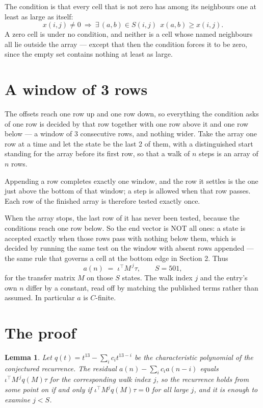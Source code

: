 \documentclass[11pt,a4paper]{article}
\theoremstyle{plain}
\newtheorem{lemma}[theorem]{Lemma}
\theoremstyle{definition}
\begin{document}
The condition is that every cell that is not zero has among its neighbours one at least as large as itself:
\[
x(i,j)\neq0\ \Longrightarrow\ \exists\,(a,b)\in S(i,j)\ \ x(a,b)\ge x(i,j).
\]
A zero cell is under no condition, and neither is a cell whose named neighbours all lie outside the array --- except that then the condition forces it to be zero, since the empty set contains nothing at least as large.

\section{A window of 3 rows}

The offsets reach one row up and one row down, so everything the condition asks of one row is
decided by that row together with one row above it and one row below --- a window of
$3$ consecutive rows, and nothing wider. Take the array one row at a time and
let the state be the last 2 of them, with a distinguished start standing for the array before its
first row, so that a walk of $n$ steps is an array of $n$ rows.

Appending a row completes exactly one window, and the row it settles is the one just above the bottom of that window; a step is
allowed when that row passes. Each row of the finished array is therefore tested exactly once.

When the array stops, the last row of it has never been tested, because the
conditions reach one row below. So the end vector is NOT all ones: a state is accepted exactly when
those rows pass with nothing below them, which is decided by running the same test on the window
with absent rows appended --- the same rule that governs a cell at the bottom edge in
Section 2.
Thus
\[
a(n)\;=\;\iota^{\!\top}M^{\,j}\tau ,\qquad S=501,
\]
for the transfer matrix $M$ on those $S$ states. The walk index $j$ and the entry's own $n$
differ by a constant, read off by matching the published terms rather than assumed. In
particular $a$ is $C$-finite.

\section{The proof}

\begin{lemma}\label{lem:crit}
Let $q(t)=t^{13}-\sum_i c_it^{13-i}$ be the characteristic polynomial of the
conjectured recurrence. The residual $a(n)-\sum_ic_ia(n-i)$ equals
$\iota^{\!\top}M^{\,j}q(M)\tau$ for the corresponding walk index $j$, so the recurrence
holds from some point on if and only if $\iota^{\!\top}M^{j}q(M)\tau=0$ for all large $j$,
and it is enough to examine $j<S$.
\end{lemma}
\end{document}
